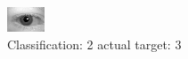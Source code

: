 \begin{figure}[h!]
\begin{center}
\includegraphics[width=0.60\columnwidth]{figures/ID574_class_2_target_3.png}
\end{center}
\caption{ Classification: 2 actual target: 3}
\label{fig:ID574_class_2_target_3}
\end{figure}
